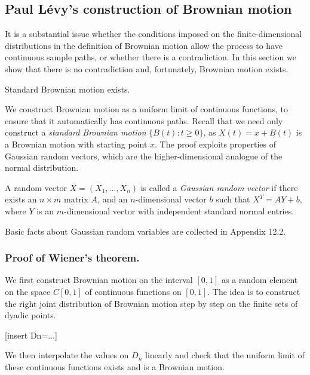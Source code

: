 \documentclass{article}
\begin{document}
\subsection{Paul Lévy's construction of Brownian motion}

It is a substantial issue whether the conditions imposed on the finite-dimensional distributions in the definition of Brownian motion allow the process to have continuous sample paths, or whether there is a contradiction. In this section we show that there is no contradiction and, fortunately, Brownian motion exists.

\begin{theorem}[Wiener 1923] \label{thm:BMexists}
Standard Brownian motion exists.
\end{theorem}

We construct Brownian motion as a uniform limit of continuous functions, to ensure that it automatically has continuous paths. Recall that we need only construct a \emph{standard Brownian motion} $\{ B(t) : t \geq 0 \}$, as $X(t) = x + B(t)$ is a Brownian motion with starting point $x$. The proof exploits properties of Gaussian random vectors, which are the higher-dimensional analogue of the normal distribution.

\begin{definition}
A random vector $X = (X_1, \dots, X_n)$ is called a \emph{Gaussian random vector} if there exists an $n \times m$ matrix $A$, and an $n$-dimensional vector $b$ such that $X^T = AY + b$, where $Y$ is an $m$-dimensional vector with independent standard normal entries.
\end{definition}

Basic facts about Gaussian random variables are collected in Appendix 12.2.

\subsubsection*{Proof of Wiener’s theorem.}
We first construct Brownian motion on the interval $[0, 1]$ as a random element on the space $C[0, 1]$ of continuous functions on $[0, 1]$. The idea is to construct the right joint distribution of Brownian motion step by step on the finite sets of dyadic points. 

[insert Dn=...]

We then interpolate the values on $D_n$ linearly and check that the uniform limit of these continuous functions exists and is a Brownian motion.
\end{document}
